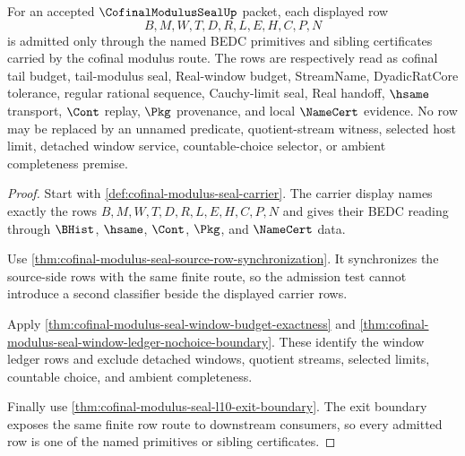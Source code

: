 \begin{theorem}
\label{thm:cofinal-modulus-seal-row-predicate-admission}
For an accepted $\CofinalModulusSealUp$ packet, each displayed row
$$
B,M,W,T,D,R,L,E,H,C,P,N
$$
is admitted only through the named BEDC primitives and sibling certificates carried by the cofinal modulus route. The rows are respectively read as cofinal tail budget, tail-modulus seal, Real-window budget, StreamName, DyadicRatCore tolerance, regular rational sequence, Cauchy-limit seal, Real handoff, $\hsame$ transport, $\Cont$ replay, $\Pkg$ provenance, and local $\NameCert$ evidence. No row may be replaced by an unnamed predicate, quotient-stream witness, selected host limit, detached window service, countable-choice selector, or ambient completeness premise.
\end{theorem}
\begin{proof}
Start with \autoref{def:cofinal-modulus-seal-carrier}. The carrier display names exactly the rows $B,M,W,T,D,R,L,E,H,C,P,N$ and gives their BEDC reading through $\BHist$, $\hsame$, $\Cont$, $\Pkg$, and $\NameCert$ data.

Use \autoref{thm:cofinal-modulus-seal-source-row-synchronization}. It synchronizes the source-side rows with the same finite route, so the admission test cannot introduce a second classifier beside the displayed carrier rows.

Apply \autoref{thm:cofinal-modulus-seal-window-budget-exactness} and \autoref{thm:cofinal-modulus-seal-window-ledger-nochoice-boundary}. These identify the window ledger rows and exclude detached windows, quotient streams, selected limits, countable choice, and ambient completeness.

Finally use \autoref{thm:cofinal-modulus-seal-l10-exit-boundary}. The exit boundary exposes the same finite row route to downstream consumers, so every admitted row is one of the named primitives or sibling certificates.
\end{proof}

